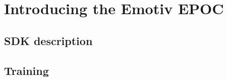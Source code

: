 \chapter{Introducing the Emotiv EPOC}
\label{cha:epoc}

\section{SDK description}

\section{Training}
